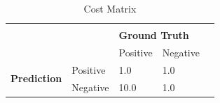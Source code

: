 \begin{table}[]
    \centering
    \begin{tabular}{lllll}
                                             &          &                                           &          & \\
        \multirow{2}{*}{}                    &          & \multicolumn{2}{l}{\textbf{Ground Truth}} &            \\
                                             &          & Positive                                  & Negative & \\
        \multirow{2}{*}{\textbf{Prediction}} & Positive & 1.0                                       & 1.0       & \\
                                             & Negative & 10.0                                      & 1.0       &
    \end{tabular}
    \caption{Cost Matrix}
    \label{table:confusion_matrix}
\end{table}


